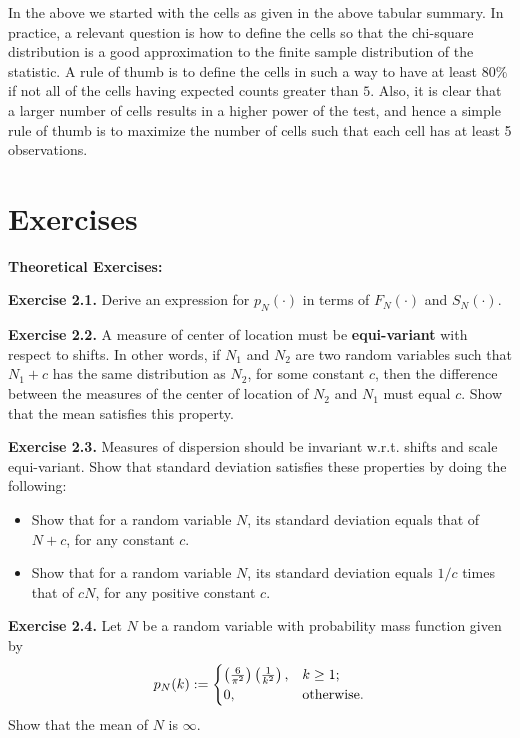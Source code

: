 \documentclass[]{book}
\providecommand{\tightlist}{%
  \setlength{\itemsep}{0pt}\setlength{\parskip}{0pt}}
\theoremstyle{definition}
\theoremstyle{definition}
\theoremstyle{definition}
\theoremstyle{remark}
\begin{document}
In the above we started with the cells as given in the above tabular
summary. In practice, a relevant question is how to define the cells so
that the chi-square distribution is a good approximation to the finite
sample distribution of the statistic. A rule of thumb is to define the
cells in such a way to have at least \(80\%\) if not all of the cells
having expected counts greater than \(5\). Also, it is clear that a
larger number of cells results in a higher power of the test, and hence
a simple rule of thumb is to maximize the number of cells such that each
cell has at least 5 observations.

\section{Exercises}\label{S:exercises}

\textbf{Theoretical Exercises:}

\textbf{Exercise 2.1.} Derive an expression for \(p_N(\cdot)\) in terms
of \(F_N(\cdot)\) and \(S_N(\cdot)\).

\textbf{Exercise 2.2.} A measure of center of location must be
\textbf{equi-variant} with respect to shifts. In other words, if \(N_1\)
and \(N_2\) are two random variables such that \(N_1+c\) has the same
distribution as \(N_2\), for some constant \(c\), then the difference
between the measures of the center of location of \(N_2\) and \(N_1\)
must equal \(c\). Show that the mean satisfies this property.

\textbf{Exercise 2.3.} Measures of dispersion should be invariant w.r.t.
shifts and scale equi-variant. Show that standard deviation satisfies
these properties by doing the following:

\begin{itemize}
\tightlist
\item
  Show that for a random variable \(N\), its standard deviation equals
  that of \(N+c\), for any constant \(c\).
\item
  Show that for a random variable \(N\), its standard deviation equals
  \(1/c\) times that of \(cN\), for any positive constant \(c\).
\end{itemize}

\textbf{Exercise 2.4.} Let \(N\) be a random variable with probability
mass function given by \[
p_N(k):= \begin{cases}
\left(\frac{6}{\pi^2}\right)\left(\frac{1}{k^{2}}\right), & k\geq 1;\\
0, &\hbox{otherwise}.
\end{cases}
\] Show that the mean of \(N\) is \(\infty\).
\end{document}
